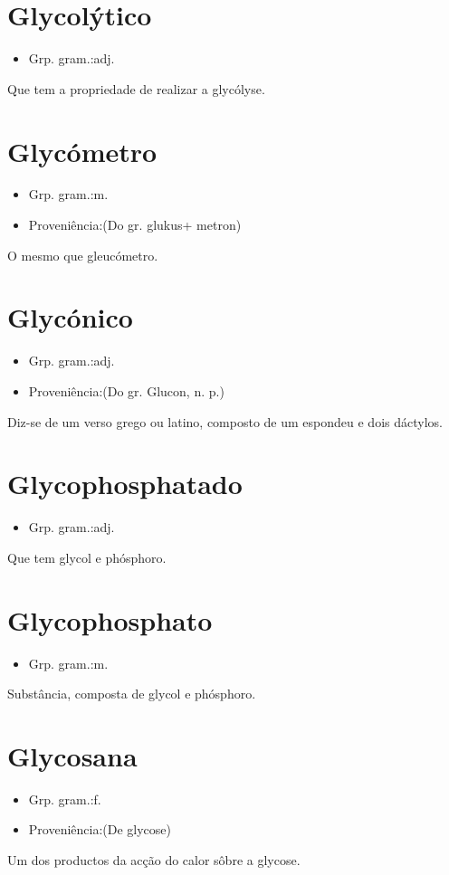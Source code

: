 \section{Glycolýtico}
\begin{itemize}
\item {Grp. gram.:adj.}
\end{itemize}
Que tem a propriedade de realizar a glycólyse.
\section{Glycómetro}
\begin{itemize}
\item {Grp. gram.:m.}
\end{itemize}
\begin{itemize}
\item {Proveniência:(Do gr. \textunderscore glukus\textunderscore  + \textunderscore metron\textunderscore )}
\end{itemize}
O mesmo que \textunderscore gleucómetro\textunderscore .
\section{Glycónico}
\begin{itemize}
\item {Grp. gram.:adj.}
\end{itemize}
\begin{itemize}
\item {Proveniência:(Do gr. \textunderscore Glucon\textunderscore , n. p.)}
\end{itemize}
Diz-se de um verso grego ou latino, composto de um espondeu e dois dáctylos.
\section{Glycophosphatado}
\begin{itemize}
\item {Grp. gram.:adj.}
\end{itemize}
Que tem glycol e phósphoro.
\section{Glycophosphato}
\begin{itemize}
\item {Grp. gram.:m.}
\end{itemize}
Substância, composta de glycol e phósphoro.
\section{Glycosana}
\begin{itemize}
\item {Grp. gram.:f.}
\end{itemize}
\begin{itemize}
\item {Proveniência:(De \textunderscore glycose\textunderscore )}
\end{itemize}
Um dos productos da acção do calor sôbre a glycose.
